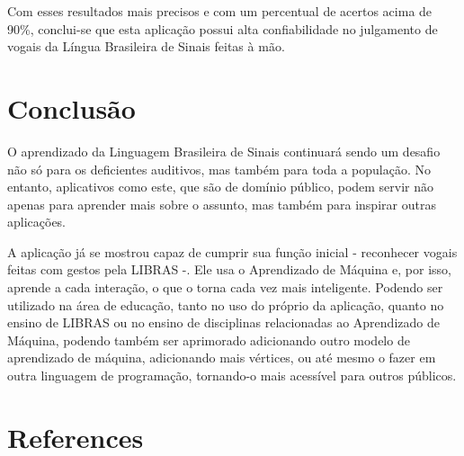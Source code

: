 \documentclass[a4paper, 12pt]{article}
\begin{document}
Com esses resultados mais precisos e com um percentual de acertos acima de 90\%, conclui-se que esta aplicação possui alta confiabilidade no julgamento de vogais da Língua Brasileira de Sinais feitas à mão.

\section{Conclusão}

O aprendizado da Linguagem Brasileira de Sinais continuará sendo um desafio não só para os deficientes auditivos, mas também para toda a população. No entanto, aplicativos como este, que são de domínio público, podem servir não apenas para aprender mais sobre o assunto, mas também para inspirar outras aplicações.

A aplicação já se mostrou capaz de cumprir sua função inicial - reconhecer vogais feitas com gestos pela LIBRAS -. Ele usa o Aprendizado de Máquina e, por isso, aprende a cada interação, o que o torna cada vez mais inteligente. Podendo ser utilizado na área de educação, tanto no uso do próprio da aplicação, quanto no ensino de LIBRAS ou no ensino de disciplinas relacionadas ao Aprendizado de Máquina, podendo também ser aprimorado adicionando outro modelo de aprendizado de máquina, adicionando mais vértices, ou até mesmo o fazer em outra linguagem de programação, tornando-o mais acessível para outros públicos.

\newpage
{\color{white}\section{References}}


\end{document}
